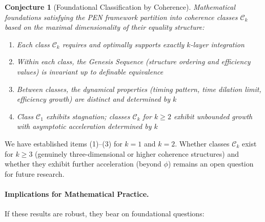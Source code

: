 \documentclass[11pt]{article}
\newtheorem{conjecture}[theorem]{Conjecture}
\theoremstyle{definition}
\theoremstyle{remark}
\begin{document}
\begin{conjecture}[Foundational Classification by Coherence]
\label{conj:foundational-classification}
Mathematical foundations satisfying the PEN framework partition into coherence classes $\mathcal{C}_k$ based on the maximal dimensionality of their equality structure:
\begin{enumerate}
\item Each class $\mathcal{C}_k$ requires and optimally supports exactly $k$-layer integration
\item Within each class, the Genesis Sequence (structure ordering and efficiency values) is invariant up to definable equivalence
\item Between classes, the dynamical properties (timing pattern, time dilation limit, efficiency growth) are distinct and determined by $k$
\item Class $\mathcal{C}_1$ exhibits stagnation; classes $\mathcal{C}_k$ for $k \geq 2$ exhibit unbounded growth with asymptotic acceleration determined by $k$
\end{enumerate}
\end{conjecture}

We have established items (1)--(3) for $k=1$ and $k=2$. Whether classes $\mathcal{C}_k$ exist for $k \geq 3$ (genuinely three-dimensional or higher coherence structures) and whether they exhibit further acceleration (beyond $\phi$) remains an open question for future research.

\paragraph{Implications for Mathematical Practice.}

If these results are robust, they bear on foundational questions:
\end{document}
